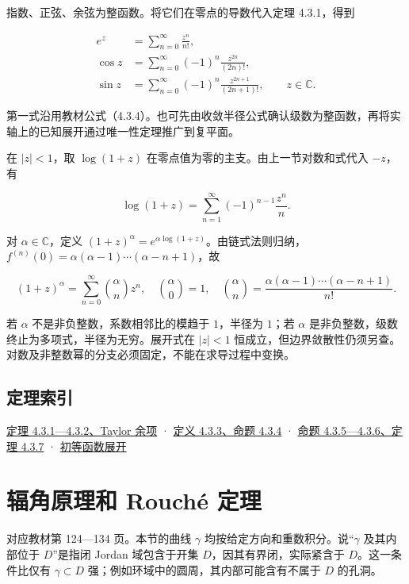 \documentclass[11pt,a4paper]{article}
\begin{document}
指数、正弦、余弦为整函数。将它们在零点的导数代入定理 4.3.1，得到

\[
\begin{aligned}
e^z&=\sum_{n=0}^{\infty}\frac{z^n}{n!},\\
\cos z&=\sum_{n=0}^{\infty}(-1)^n\frac{z^{2n}}{(2n)!},\\
\sin z&=\sum_{n=0}^{\infty}(-1)^n\frac{z^{2n+1}}{(2n+1)!},\qquad z\in\mathbb C.
\end{aligned}
\]

第一式沿用教材公式（4.3.4）。也可先由收敛半径公式确认级数为整函数，再将实轴上的已知展开通过唯一性定理推广到复平面。

在 \(|z|<1\)，取 \(\log(1+z)\) 在零点值为零的主支。由上一节对数和式代入
\(-z\)，有

\[
\log(1+z)=\sum_{n=1}^{\infty}(-1)^{n-1}\frac{z^n}{n}.
\]

对 \(\alpha\in\mathbb C\)，定义
\((1+z)^\alpha=e^{\alpha\log(1+z)}\)。由链式法则归纳，\(f^{(n)}(0)=\alpha(\alpha-1)\cdots(\alpha-n+1)\)，故

\[
(1+z)^\alpha=\sum_{n=0}^{\infty}\binom\alpha n z^n,
\quad
\binom\alpha0=1,\quad
\binom\alpha n=\frac{\alpha(\alpha-1)\cdots(\alpha-n+1)}{n!}.
\]

若 \(\alpha\) 不是非负整数，系数相邻比的模趋于 \(1\)，半径为 \(1\)；若
\(\alpha\) 是非负整数，级数终止为多项式，半径为无穷。展开式在 \(|z|<1\)
恒成立，但边界敛散性仍须另查。对数及非整数幂的分支必须固定，不能在求导过程中变换。

\subsection{定理索引}\label{ch04-s3-heading-5}

\hyperref[ch04-s3-heading-1]{定理 4.3.1---4.3.2、Taylor 余项} ·
\hyperref[ch04-s3-heading-2]{定义 4.3.3、命题 4.3.4} · \hyperref[ch04-s3-heading-3]{命题
4.3.5---4.3.6、定理 4.3.7} · \hyperref[ch04-s3-heading-4]{初等函数展开}

\section{辐角原理和 Rouché 定理}
对应教材第 124---134 页。本节的曲线 \(\gamma\)
均按给定方向和重数积分。说``\(\gamma\) 及其内部位于 \(D\)''是指闭 Jordan
域包含于开集 \(D\)，因其有界闭，实际紧含于 \(D\)。这一条件比仅有
\(\gamma\subset D\) 强；例如环域中的圆周，其内部可能含有不属于 \(D\)
的孔洞。

\end{document}
